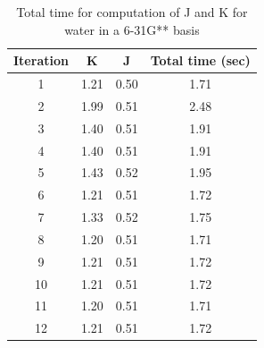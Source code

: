 \documentclass[12pt,a4paper,english]{beamer}
\begin{document}

%
\begin{frame}
        \begin{table}
                \centering
                \begin{tabular}{|c|c|c|c|}
                         Iteration & K&J&Total time (sec) \\
\hline
                         1 & 1.21 & 0.50 &1.71\\ 
                         2 & 1.99 & 0.51 &2.48\\ 
                         3 & 1.40 & 0.51 &1.91\\ 
                         4 & 1.40 & 0.51 &1.91\\ 
                         5 & 1.43 & 0.52 &1.95\\ 
                         6 & 1.21 & 0.51 &1.72\\ 
                         7 & 1.33 & 0.52 &1.75\\ 
                         8 & 1.20 & 0.51 &1.71\\ 
                         9 & 1.21 & 0.51 &1.72\\ 
                        10 & 1.21 & 0.51 &1.72\\ 
                        11 & 1.20 & 0.51 &1.71\\ 
                        12 & 1.21 & 0.51 &1.72\\ 
                \end{tabular}
                \caption{Total time for computation of J and K for water in a 6-31G** basis}
                \label{tab:1}
        \end{table}          
\end{frame}
  
  
  
  
  
  
  
  
  
  
  
   
\end{document}
